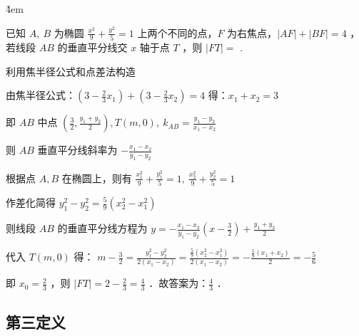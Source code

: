 \v{4em}

\begin{example}
    已知 $A, ~ B$ 为椭圆 $\frac{x^2}{9}+\frac{y^2}{5}=1$ 上两个不同的点，$F$ 为右焦点，$|A F|+|B F|=4$ ，若线段 $A B$ 的垂直平分线交 $x$ 轴于点 $T$ ，则 $|F T|=$ \underline{\qquad}.
\end{example}

\begin{tips}
    利用焦半径公式和点差法构造
\end{tips}

\begin{solution}
    \begin{minipage}[c]{0.55\textwidth}
        由焦半径公式：$\left(3-\frac{2}{3} x_1\right)+\left(3-\frac{2}{3} x_2\right)=4$ 得：$x_1+x_2=3$

        即 $A B$ 中点 $\left(\frac{3}{2}, \frac{y_1+y_2}{2}\right), T(m, 0), ~ k_{A B}=\frac{y_1-y_2}{x_1-x_2}$

        则 $A B$ 垂直平分线斜率为 $-\frac{x_1-x_2}{y_1-y_2}$

        根据点 $A, B$ 在椭圆上，则有 $\frac{x_1^2}{9}+\frac{y_1^2}{5}=1, ~ \frac{x_2^2}{9}+\frac{y_2^2}{5}=1$

        作差化简得 $y_1^2-y_2^2=\frac{5}{9}\left(x_2^2-x_1^2\right)$

        则线段 $A B$ 的垂直平分线方程为 $y=-\frac{x_1-x_2}{y_1-y_2}\left(x-\frac{3}{2}\right)+\frac{y_1+y_2}{2}$

        代入 $T(m, 0)$ 得： $m-\frac{3}{2}=\frac{y_1^2-y_2^2}{2\left(x_1-x_2\right)}=\frac{\frac{5}{9}\left(x_2^2-x_1^2\right)}{2\left(x_1-x_2\right)}=-\frac{\frac{5}{9}\left(x_1+x_2\right)}{2}=-\frac{5}{6}$

        即 $x_0=\frac{2}{3}$ ，则 $|F T|=2-\frac{2}{3}=\frac{4}{3}$ ．故答案为：$\frac{4}{3}$ ．
    \end{minipage} %
    \begin{minipage}[c]{0.4\textwidth}
        \begin{figure} [H]
            \centering
            \resizebox{0.6\textwidth}{!}{}
        \end{figure}
    \end{minipage}
\end{solution}

\subsection{第三定义}

